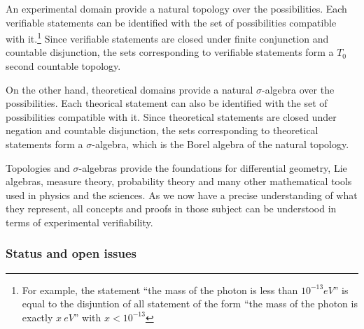 \documentclass[twocolumn]{article}
\newif\ifextended
\newcommand\fact[2]{\ifextended \emph{#1}. #2 \fi}
\begin{document}
An experimental domain provide a natural topology over the possibilities. Each verifiable statements can be identified with the set of possibilities compatible with it.\footnote{For example, the statement ``the mass of the photon is less than $10^{-13} eV$'' is equal to the disjuntion of all statement of the form ``the mass of the photon is exactly $x~eV$'' with $x <  10^{-13}$} Since verifiable statements are closed under finite conjunction and countable disjunction, the sets corresponding to verifiable statements form a $T_0$ second countable topology.

On the other hand, theoretical domains provide a natural $\sigma$-algebra over the possibilities. Each theorical statement can also be identified with the set of possibilities compatible with it. Since theoretical statements are closed under negation and countable disjunction, the sets corresponding to theoretical statements form a $\sigma$-algebra, which is the Borel algebra of the natural topology.

Topologies and $\sigma$-algebras provide the foundations for differential geometry, Lie algebras, measure theory, probability theory and many other mathematical tools used in physics and the sciences. As we now have a precise understanding of what they represent, all concepts and proofs in those subject can be understood in terms of experimental verifiability.

\fact{Interior, exterior and boundary}{Given a test associated to a theoretical statement, it will either terminate successfully, terminate unsuccessfully or never terminate. Each Borel set is associated with a theoretical statement, which means it is associated with a test. The interior of the Borel set represents the cases in which the test will terminate successfully; the exterior represents the cases in which the tests will terminate unsuccessfully; the boundary represents the cases in which the test will not terminate.}

\fact{Decidable and undecidable statements}{A theoretical statement is decidable if the associated test always terminates, which means the boundary is empty. This corresponds to a clopen set. It is undecidable if the associated test never terminates, which means the boundary is the full set.\footnote{For example, ``there are three apples in the bowl'' is a decidable statement, while ``the mass of the electron is a rational number when expressed in eV'' is undecidable.}}

\subsubsection{Status and open issues}
\end{document}
